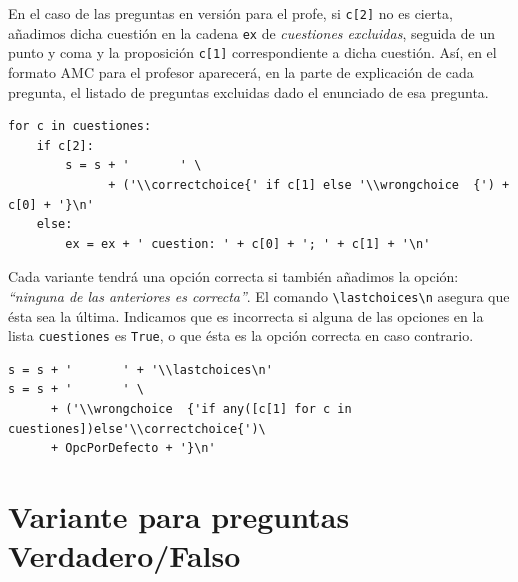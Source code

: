 \documentclass[10pt,a4paper]{report}
\begin{document}
En el caso de las preguntas en versión para el profe, si \texttt{c[2]} no es cierta, añadimos dicha cuestión en la cadena \texttt{ex} de \emph{cuestiones excluidas}, seguida de un punto y coma y la proposición \texttt{c[1]} correspondiente a dicha cuestión.
Así, en el formato AMC para el profesor aparecerá, en la parte de explicación de cada pregunta, el listado de preguntas excluidas dado el enunciado de esa pregunta.

\begin{verbatim}
for c in cuestiones:
    if c[2]:
        s = s + '       ' \
              + ('\\correctchoice{' if c[1] else '\\wrongchoice  {') + c[0] + '}\n'
    else:
        ex = ex + ' cuestion: ' + c[0] + '; ' + c[1] + '\n'
\end{verbatim}

Cada variante tendrá una opción correcta si también añadimos la opción: \emph{``ninguna de las anteriores es correcta''}.
El comando \texttt{\textbackslash{}lastchoices\textbackslash{}n} asegura que ésta sea la última.
Indicamos que es incorrecta si alguna de las opciones en la lista \texttt{cuestiones} es \texttt{True}, o que ésta es la opción correcta en caso contrario.
\begin{verbatim}
s = s + '       ' + '\\lastchoices\n'
s = s + '       ' \
      + ('\\wrongchoice  {'if any([c[1] for c in cuestiones])else'\\correctchoice{')\
      + OpcPorDefecto + '}\n'
\end{verbatim}
\section{Variante para preguntas Verdadero/Falso}
\label{sec:org84b2359}
\end{document}
